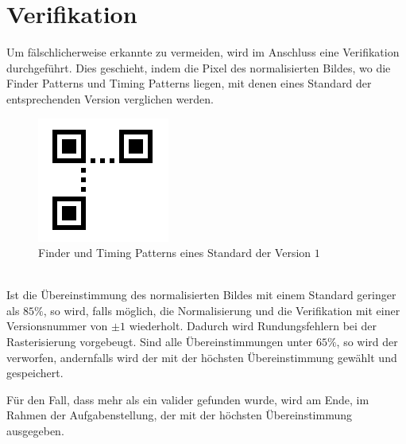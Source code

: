 \section{Verifikation}
Um fälschlicherweise erkannte \QRCodes zu vermeiden, wird im Anschluss eine Verifikation durchgeführt. Dies geschieht, indem die Pixel des normalisierten Bildes, wo die Finder Patterns und Timing Patterns liegen, mit denen eines Standard \QRCodes der entsprechenden Version verglichen werden.
\begin{figure}[h]
\centering
\includegraphics[scale=0.5]{images/verifikation.png}
\caption{Finder und Timing Patterns eines Standard \QRCodes der Version $1$}
\end{figure}
\\
Ist die Übereinstimmung des normalisierten Bildes mit einem Standard \QRCode geringer als $85\%$, so wird, falls möglich, die Normalisierung und die Verifikation mit einer Versionsnummer von $\pm 1$ wiederholt. Dadurch wird Rundungsfehlern bei der Rasterisierung vorgebeugt. Sind alle Übereinstimmungen unter $65\%$, so wird der \QRCode verworfen, andernfalls wird der \QRCode mit der höchsten Übereinstimmung gewählt und gespeichert.

Für den Fall, dass mehr als ein valider \QRCode gefunden wurde, wird am Ende, im Rahmen der Aufgabenstellung, der \QRCode mit der höchsten Übereinstimmung ausgegeben.